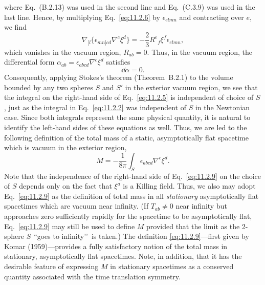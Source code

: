 where Eq.~(B.2.13) was used in the second line and Eq.~(C.3.9) was used in the last
line. Hence, by multiplying Eq.~\eqref{eq:11.2.6} by \(\epsilon_{elmn}\) and
contracting over \(e\), we find
\begin{equation}
  \nabla_{[l}\{\epsilon_{mn]cd}\nabla^c\xi^d\}
  =-\frac23R^e{}_f\xi^f\epsilon_{elmn},
  \tag{11.2.7}\label{eq:11.2.7}
\end{equation}
which vanishes in the vacuum region, \(R_{ab}=0\). Thus, in the vacuum region, the
differential form \(\alpha_{ab}=\epsilon_{abcd}\nabla^c\xi^d\) satisfies
\begin{equation}
  \dd\alpha=0.
  \tag{11.2.8}\label{eq:11.2.8}
\end{equation}
Consequently, applying Stokes's theorem (Theorem~B.2.1) to the volume bounded by
any two spheres \(S\) and \(S'\) in the exterior vacuum region, we see that the
integral on the right-hand side of Eq.~\eqref{eq:11.2.5} is independent of choice of
\(S\), just as the integral in Eq.~\eqref{eq:11.2.2} was independent of \(S\) in the
Newtonian case. Since both integrals represent the same physical quantity, it is
natural to identify the left-hand sides of these equations as well. Thus, we are led
to the following definition of the total mass of a static, asymptotically flat
spacetime which is vacuum in the exterior region,
\begin{equation}
  M=-\frac{1}{8\pi}\int_S\epsilon_{abcd}\nabla^c\xi^d.
  \tag{11.2.9}\label{eq:11.2.9}
\end{equation}
Note that the independence of the right-hand side of Eq.~\eqref{eq:11.2.9} on the
choice of \(S\) depends only on the fact that \(\xi^a\) is a Killing field. Thus, we
also may adopt Eq.~\eqref{eq:11.2.9} as the definition of total mass in all
\emph{stationary} asymptotically flat spacetimes which are vacuum near infinity. (If
\(T_{ab}\ne0\) near infinity but approaches zero sufficiently rapidly for the
spacetime to be asymptotically flat, Eq.~\eqref{eq:11.2.9} may still be used to define
\(M\) provided that the limit as the 2-sphere \(S\) \lq\lq goes to infinity\rq\rq\ is
taken.) The definition \eqref{eq:11.2.9}---first given by Komar (1959)---provides a
fully satisfactory notion of the total mass in stationary, asymptotically flat
spacetimes. Note, in addition, that it has the desirable feature of expressing \(M\)
in stationary spacetimes as a conserved quantity associated with the time translation
symmetry.

